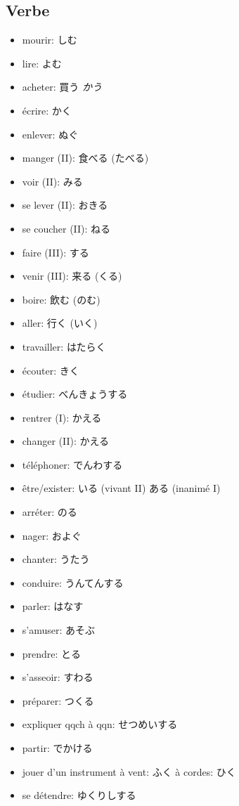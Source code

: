 \documentclass{article}
\begin{document}
\begin{CJK}{UTF8}{min}
    \subsection{Verbe}
    \begin{itemize}
        \item mourir: しむ
        \item lire: よむ
        \item acheter: 買う \textit{かう} 
        \item écrire: かく
        \item enlever: ぬぐ
        \item manger (II): 食べる (たべる)
        \item voir (II): みる
        \item se lever (II): おきる
        \item se coucher (II): ねる
        \item faire (III): する
        \item venir (III): 来る (くる)
        \item boire: 飲む (のむ)
        \item aller: 行く (いく)
        \item travailler: はたらく
        \item écouter: きく
        \item étudier: べんきょうする
        \item rentrer (I):  かえる
        \item changer (II): かえる
        \item téléphoner: でんわする
        \item être/exister: いる (vivant II) ある (inanimé I)
        \item arréter: のる
        \item nager: およぐ
        \item chanter: うたう
        \item conduire: うんてんする
        \item parler: はなす
        \item s'amuser: あそぶ
        \item prendre: とる
        \item s'asseoir: すわる
        \item préparer: つくる
        \item expliquer qqch à qqn: せつめいする
        \item partir: でかける
        \item jouer d'un instrument à vent: ふく à cordes: ひく
        \item se détendre: ゆくりしする
    \end{itemize}

\end{CJK}
\end{document}
